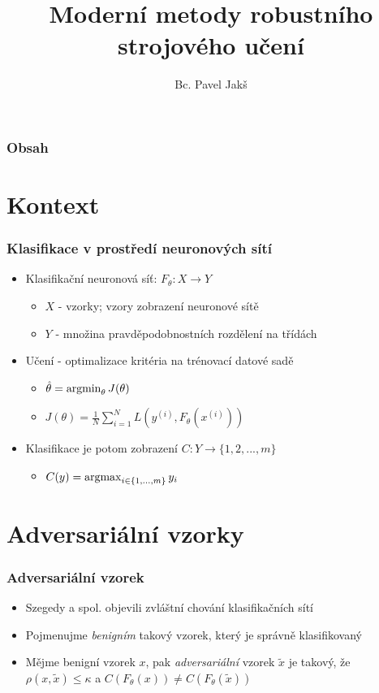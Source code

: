 \documentclass[czech]{beamer}
\title{Moderní metody robustního strojového učení}
\author{Bc. Pavel Jakš}
\institute{Matematická informatika, FJFI ČVUT v Praze}
\begin{document}

\frame{\titlepage}

\begin{frame}
    \frametitle{Obsah}
    \tableofcontents
\end{frame}

\section{Kontext}

\begin{frame}
    \frametitle{Klasifikace v prostředí neuronových sítí}
    \begin{itemize}
        \item Klasifikační neuronová síť: $F_\theta : X \rightarrow Y$
        \begin{itemize}
            \item $X$ - vzorky; vzory zobrazení neuronové sítě
            \item $Y$ - množina pravděpodobnostních rozdělení na třídách
        \end{itemize}
        \item Učení - optimalizace kritéria na trénovací datové sadě
        \begin{itemize}
            \item $\hat{\theta} = \operatornamewithlimits{argmin}_{\theta} J(\theta)$
            \item $J(\theta) = \frac{1}{N} \sum_{i=1}^{N} L(y^{(i)}, F_\theta(x^{(i)}))$
        \end{itemize}
        \item Klasifikace je potom zobrazení $C: Y \rightarrow \{1, 2, ..., m\}$
        \begin{itemize}
            \item $C(y) = \operatornamewithlimits{argmax}_{i \in \{1, ..., m\}} y_i$
        \end{itemize} 
    \end{itemize}
\end{frame}

\section{Adversariální vzorky}

\begin{frame}
    \frametitle{Adversariální vzorek}
    \begin{itemize}
        \item Szegedy a spol. objevili zvláštní chování klasifikačních sítí \cite{szegedy2014intriguing}
        \item Pojmenujme \emph{benigním} takový vzorek, který je správně klasifikovaný
        \item Mějme benigní vzorek $x$, pak \emph{adversariální} vzorek $\tilde{x}$ je takový, že
        $\rho(x, \tilde{x}) \leq \kappa$ a $C(F_\theta(x)) \neq C(F_\theta(\tilde{x}))$
    \end{itemize}
\end{frame}
\end{document}
